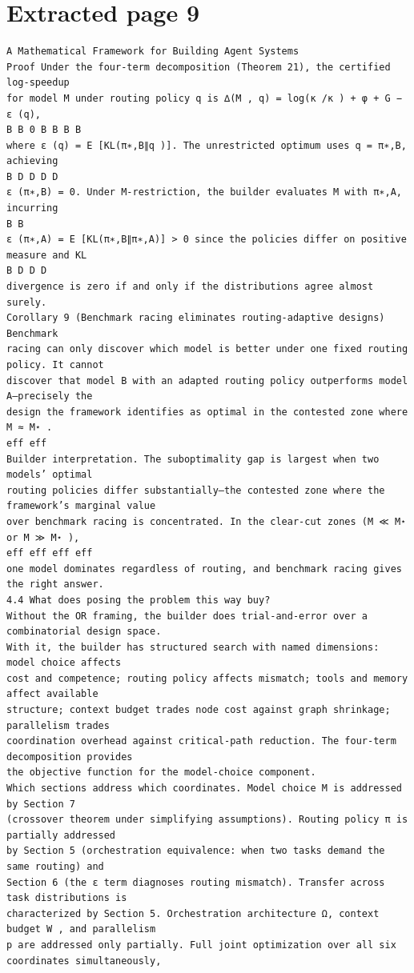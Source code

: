 \documentclass[11pt]{article}
\begin{document}
\clearpage
\section*{Extracted page 9}
\begin{verbatim}
A Mathematical Framework for Building Agent Systems
Proof Under the four-term decomposition (Theorem 21), the certified log-speedup
for model M under routing policy q is ∆(M , q) = log(κ /κ ) + φ + G − ε (q),
B B 0 B B B B
where ε (q) = E [KL(π∗,B∥q )]. The unrestricted optimum uses q = π∗,B, achieving
B D D D D
ε (π∗,B) = 0. Under M-restriction, the builder evaluates M with π∗,A, incurring
B B
ε (π∗,A) = E [KL(π∗,B∥π∗,A)] > 0 since the policies differ on positive measure and KL
B D D D
divergence is zero if and only if the distributions agree almost surely.
Corollary 9 (Benchmark racing eliminates routing-adaptive designs) Benchmark
racing can only discover which model is better under one fixed routing policy. It cannot
discover that model B with an adapted routing policy outperforms model A—precisely the
design the framework identifies as optimal in the contested zone where M ≈ M⋆ .
eff eff
Builder interpretation. The suboptimality gap is largest when two models’ optimal
routing policies differ substantially—the contested zone where the framework’s marginal value
over benchmark racing is concentrated. In the clear-cut zones (M ≪ M⋆ or M ≫ M⋆ ),
eff eff eff eff
one model dominates regardless of routing, and benchmark racing gives the right answer.
4.4 What does posing the problem this way buy?
Without the OR framing, the builder does trial-and-error over a combinatorial design space.
With it, the builder has structured search with named dimensions: model choice affects
cost and competence; routing policy affects mismatch; tools and memory affect available
structure; context budget trades node cost against graph shrinkage; parallelism trades
coordination overhead against critical-path reduction. The four-term decomposition provides
the objective function for the model-choice component.
Which sections address which coordinates. Model choice M is addressed by Section 7
(crossover theorem under simplifying assumptions). Routing policy π is partially addressed
by Section 5 (orchestration equivalence: when two tasks demand the same routing) and
Section 6 (the ε term diagnoses routing mismatch). Transfer across task distributions is
characterized by Section 5. Orchestration architecture Ω, context budget W , and parallelism
p are addressed only partially. Full joint optimization over all six coordinates simultaneously,

\end{verbatim}
\end{document}
